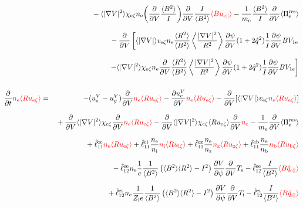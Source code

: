 \documentclass[11pt]{article}
\def\r#1{{\rm#1}}
\def\ave#1{\left\langle#1\right\rangle}
\def\aves#1{\langle#1\rangle}
\def\dd#1#2{\frac{\partial #1}{\partial #2}}
\def\para{\parallel}
\def\ddV{\frac{\partial}{\partial V}}
\def\ddt{\frac{\partial}{\partial t}}
\def\me{m_\r{e}}
\def\nee{n_\r{e}}
\def\ni{n_\r{i}}
\def\nz{n_\r{z}}
\def\nb{n_\r{b}}
\def\Te{T_\r{e}}
\def\Ti{T_\r{i}}
\def\Zi{Z_\r{i}}
\def\uzt#1{u_{\r{#1}\zeta}}
\def\upara#1{u_{\r{#1}\para}}
\def\qhatpara#1{\hat{q}_{\r{#1}\para}}
\def\uV#1{u_\r{#1}^V}
\def\ugV{u_{g}^V}
\def\chis#1{\chi_\r{#1}}
\def\bri{\aves{B^2}\aves{R^2} - I^2}
\def\red#1{\textcolor{red}{#1}}
\begin{document}
\begin{eqnarray}
\nonumber\\[3mm]&&{}
%
  - \aves{|\nabla V|^2} \chis{e\zeta} \nee \biggl( \ddV
  \frac{\aves{B^2}}{I} \biggr) \ddV \frac{I}{\aves{B^2}} \red{\aves{B \upara{e}}}
%
  - \frac{1}{\me} \frac{\aves{B^2}}{I} \ddV \aves{\Pi_\r{e}^\r{res}}
\nonumber\\[3mm]&&{}
%
  - \ddV
    \left[  \aves{|\nabla V|} v_{\r{e}\zeta} \nee
            \frac{\aves{R^2}}{\aves{B^2}}\ave{\frac{|\nabla V|^2}{R^2}}\dd{\psi}{V}(1+2\hat{q}^2)
	    \frac{1}{I} \dd{\psi}{V} BV_{1\r{e}} \right.
\nonumber\\[3mm]&&{}
    \left.- \aves{|\nabla V|^2} \chis{e\zeta} \nee
          \ddV \frac{\aves{R^2}}{\aves{B^2}}\ave{\frac{|\nabla V|^2}{R^2}}\dd{\psi}{V}(1+2\hat{q}^2)
	  \frac{1}{I} \dd{\psi}{V} BV_{1\r{e}}\right]
\\[5mm]
 \ddt \red{\nee \aves{R \uzt{e}}} &=&
%
  - (\uV{e} - \ugV) \ddV \red{\nee \aves{R \uzt{e}}}
%
  - \dd{\uV{e}}{V} \red{\nee \aves{R \uzt{e}}}
%
  - \ddV [\aves{|\nabla V|} v_{\r{e}\zeta} \red{\nee \aves{R \uzt{e}}}]
\nonumber\\[3mm]&&{}
  + \ddV \aves{|\nabla V|^2} \chis{e\zeta} \ddV \red{\nee \aves{R \uzt{e}}}
  - \ddV \aves{|\nabla V|^2} \chis{e\zeta} \aves{R \uzt{e}} \ddV \red{\nee}
  - \frac{1}{\me} \ddV \aves{\Pi_\r{e}^\r{res}}
\nonumber\\[2.5mm]&&{}
%
  + \hat{\ell}_{11}^\r{ee}                  \red{\nee \aves{R \uzt{e}}}
  + \hat{\ell}_{11}^\r{ei} \frac{\nee}{\ni} \red{\ni  \aves{R \uzt{i}}}
  + \hat{\ell}_{11}^\r{ez} \frac{\nee}{\nz} \red{\nz  \aves{R \uzt{z}}}
  + \hat{\ell}_{11}^\r{eb} \frac{\nee}{\nb} \red{\nb  \aves{R \uzt{b}}}
\nonumber\\[2.5mm]&&{}
%
  - \hat{\ell}_{12}^\r{ee} \nee \frac{1}{e} \frac{1}{\aves{B^2}} \left( \bri \right)
    \dd{V}{\psi} \ddV \Te
  - \hat{\ell}_{12}^\r{ee} \frac{I}{\aves{B^2}} \red{\aves{B \qhatpara{e}}}
\nonumber\\[2.5mm]&&{}
  + \hat{\ell}_{12}^\r{ei} \nee \frac{1}{\Zi e} \frac{1}{\aves{B^2}} \left( \bri \right)
    \dd{V}{\psi} \ddV \Ti
  - \hat{\ell}_{12}^\r{ei} \frac{I}{\aves{B^2}} \red{\aves{B \qhatpara{i}}}
\nonumber\\[2.5mm]&&{}

\end{eqnarray}
\end{document}
